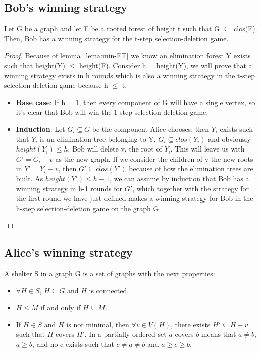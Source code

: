 \subsection{Bob's winning strategy}
\begin{lemma}
Let G be a graph and let F be a rooted forest of height t such that G $\subseteq$ clos(F). Then, Bob has a winning strategy for the t-step selection-deletion game.
\label{lemma:Bob-win}
\end{lemma}
\begin{proof}
Because of lemma~\ref{lema:min-ET} we know an elimination forest Y exists such that height(Y) $\leq$ height(F).
Consider h = height(Y), we will prove that a winning strategy exists in h rounds which is also a winning strategy in the t-step selection-deletion game because h $\leq$ t.
\begin{itemize}
  \item \textbf{Base case}: If h = 1, then every component of G will have a single vertex, so it's clear that Bob will win the 1-step selection-deletion game.
  \item \textbf{Induction}: Let $G_i \subseteq G$ be the component Alice chooses, then $Y_i$ exists such that $Y_i$ is an elimination tree belonging to Y, $G_i \subseteq clos(Y_i)$ and obviously $height(Y_i) \leq h$. Bob will delete v, the root of $Y_i$. This will leave us with $G' = G_i - v$ as the new graph. If we consider the children of v the new roots in $Y' = Y_i - v$, then $G' \subseteq clos(Y')$ because of how the elimination trees are built. As $height(Y') \leq h-1$, we can assume by induction that Bob has a winning strategy in h-1 rounds for $G'$, which together with the strategy for the first round we have just defined makes a winning strategy for Bob in the h-step selection-deletion game on the graph G.
\end{itemize}
\end{proof}

\subsection{Alice's winning strategy}
\begin{definition}
A shelter S in a graph G is a set of graphs with the next properties:
\begin{itemize}
  \item $\forall H \in S$, $H \subseteq G$ and $H$ is connected.
  \item $H \leq M$ if and only if $H \subseteq M$.
  \item If $H \in S$ and $H$ is not minimal, then $\forall v \in V(H)$, there exists $H' \subseteq H - v$ such that $H$ covers $H'$. In a partially ordered set $a$ covers $b$ means that $a \neq b$, $a \geq b$, and no c exists such that $c \neq a \neq b$ and $a \geq c \geq b$.
\end{itemize}
\end{definition}

